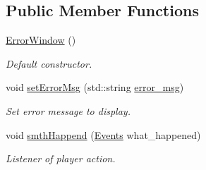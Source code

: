 \subsection*{Public Member Functions}
\begin{DoxyCompactItemize}
\item 
\mbox{\label{class_error_window_a6a1f634d7aab03610249b4988f374314}} 
\hyperlink{class_error_window_a6a1f634d7aab03610249b4988f374314}{Error\+Window} ()
\begin{DoxyCompactList}\small\item\em Default constructor. \end{DoxyCompactList}\item 
void \hyperlink{class_error_window_ac5adc252881ca2932b4804a51da44d3e}{set\+Error\+Msg} (std\+::string \hyperlink{class_error_window_ad282b1abbf57a6c004b1ccfa48355f49}{error\+\_\+msg})
\begin{DoxyCompactList}\small\item\em Set error message to display. \end{DoxyCompactList}\item 
void \hyperlink{class_error_window_af9096dfdd53c4e788e62ce543f939f01}{smth\+Happend} (\hyperlink{_events_8h_af60e00b78607064c5be6aa9397ea49c1}{Events} what\+\_\+happened)
\begin{DoxyCompactList}\small\item\em Listener of player action. \end{DoxyCompactList}\end{DoxyCompactItemize}
